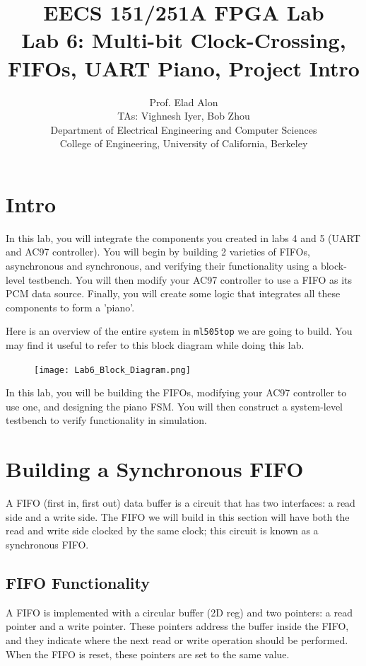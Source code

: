 \documentclass[11pt]{article}
\begin{document}
\title{EECS 151/251A FPGA Lab\\
Lab 6: Multi-bit Clock-Crossing, FIFOs, UART Piano, Project Intro}

\author{Prof. Elad Alon \\
TAs: Vighnesh Iyer, Bob Zhou \\Department of Electrical Engineering and Computer Sciences\\
College of Engineering, University of California, Berkeley}
\date{}
\maketitle

\tableofcontents

\section{Intro}
In this lab, you will integrate the components you created in labs 4 and 5 (UART and AC97 controller). You will begin by building 2 varieties of FIFOs, asynchronous and synchronous, and verifying their functionality using a block-level testbench. You will then modify your AC97 controller to use a FIFO as its PCM data source. Finally, you will create some logic that integrates all these components to form a 'piano'.

Here is an overview of the entire system in \verb|ml505top| we are going to build. You may find it useful to refer to this block diagram while doing this lab.

\begin{figure}[H]
	\centerline{\texttt{[image: Lab6\_Block\_Diagram.png]}}
\end{figure}

In this lab, you will be building the FIFOs, modifying your AC97 controller to use one, and designing the piano FSM. You will then construct a system-level testbench to verify functionality in simulation.

\section{Building a Synchronous FIFO}
A FIFO (first in, first out) data buffer is a circuit that has two interfaces: a read side and a write side. The FIFO we will build in this section will have both the read and write side clocked by the same clock; this circuit is known as a synchronous FIFO.

\subsection{FIFO Functionality}
A FIFO is implemented with a circular buffer (2D reg) and two pointers: a read pointer and a write pointer. These pointers address the buffer inside the FIFO, and they indicate where the next read or write operation should be performed. When the FIFO is reset, these pointers are set to the same value. 
\end{document}
